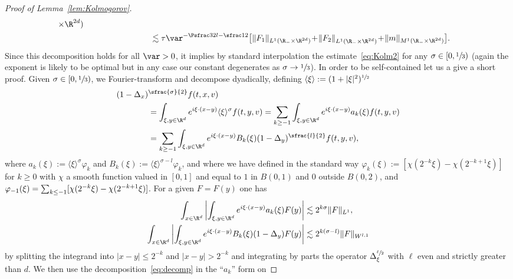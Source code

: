 \begin{proof}[Proof of Lemma~\ref{lem:Kolmogorov}]
\begin{align*}
{\times \R^{2d})} \\
& \hphantom{\| f_\var \|_{L^1(\R_- \times \R^{2d})}} \lesssim
\tau \var^{-\Psfrac32 l -\sfrac12}
\bigl[ \| F_1 \|_{L^1(\R_- \times \R^{2d})} \!+\!
\left\| F_2 \right\|_{L^1(\R_- \times \R^{2d})}
\!+\! \| m \|_{M^1(\R_- \times \R^{2d})} \bigr].
\end{align*}
Since this decomposition holds for all $\var >0$, it implies by
standard interpolation the estimate~\eqref{eq:Kolm2} for any
$\sigma \in [0,\sfrac{1}{3})$ (again the exponent is likely to
be optimal but in any case our constant degenerates as
$\sigma \to \sfrac{1}{3}$). In order to be self-contained let us
a give a short proof. Given $\sigma \in [0,\sfrac13)$, we
Fourier-transform and decompose dyadically, defining
$\langle \xi \rangle:= (1+|\xi|^2)^{\sfrac12}$
\begin{equation}
\label{eq:decomp}
\begin{aligned}
(1-\Delta_x)&^{\sfrac{\sigma}{2}} f(t,x,v) \\
&= \int_{\xi,y \in \R^d} e^{i \xi
\cdot (x-y)} \langle \xi \rangle^\sigma
f(t,y,v)
= \sum_{k \ge -1} \int_{\xi,y \in \R^d} e^{i \xi
\cdot (x-y)} a_k(\xi) f(t,y,v) \\
&= \sum_{k \ge -1} \int_{\xi,y \in \R^d} e^{i \xi
\cdot (x-y)} B_k(\xi) (1-\Delta_y)^{\sfrac{l}{2}} f(t,y,v),
\end{aligned}
\end{equation}
where $a_k(\xi) := \langle \xi \rangle^\sigma \varphi_k$ and
$B_k(\xi) := \langle \xi \rangle^{\sigma-l} \varphi_k$, and
where we have defined in the standard way
$\varphi_k(\xi) := [ \chi(2^{-k}\xi) - \chi(2^{-k+1} \xi) ]$
for $k \ge 0$ with $\chi$ a smooth function valued in $[0,1]$
and equal to $1$ in $B(0,1)$ and $0$ outside $B(0,2)$, and
$\varphi_{-1}(\xi) =\nobreak \sum_{k \le -1} [ \chi(2^{-k}\xi) -\nobreak
\chi(2^{-k+1} \xi) ]$. For a given $F=F(y)$ one has
\begin{align*}
\int_{x \in \R^d} \left| \int_{\xi,y \in \R^d} e^{i \xi
\cdot (x-y)} a_k(\xi) F(y)
\right| &\lesssim 2^{k\sigma} \| F \|_{L^1}, \\
\int_{x \in \R^d} \left| \int_{\xi,y \in \R^d} e^{i \xi
\cdot (x-y)} B_k(\xi) (1-\Delta_y) F(y)
\right| &\lesssim 2^{k(\sigma-l)} \| F \|_{W^{l,1}}
\end{align*}
by splitting the integrand into $|x-y| \le 2^{-k}$ and
$|x-y| > 2^{-k}$ and integrating by parts the operator
$\Delta_\xi^{\sfrac{\ell}{2}}$ with $\ell$ even and strictly
greater than $d$. We then use the
decomposition~\eqref{eq:decomp} in the ``$a_k$'' form on

\end{proof}
